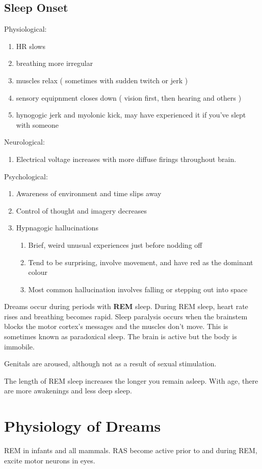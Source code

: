 \documentclass[12pt]{article}
\begin{document}
\subsection*{Sleep Onset}
Physiological:
\begin{enumerate}
  \item HR slows
  \item breathing more irregular
  \item muscles relax ( sometimes with sudden twitch or jerk )
  \item sensory equipnment closes down ( vision first, then hearing and others )
  \item hynogogic jerk and myolonic kick, may have experienced it if you've slept with someone
\end{enumerate}
Neurological:
\begin{enumerate}
\item Electrical voltage increases with more diffuse firings throughout brain.
\end{enumerate}
Psychological:
\begin{enumerate}
\item Awareness of environment and time slips away
\item Control of thought and imagery decreases
\item Hypnagogic hallucinations
\begin{enumerate}
\item Brief, weird unusual experiences just before nodding off
\item Tend to be surprising, involve movement, and have red as the dominant colour
\item Most common hallucination involves falling or stepping out into space
\end{enumerate}
\end{enumerate}
Dreams occur during periods with \textbf{REM} sleep. During REM sleep, heart rate rises and breathing becomes rapid. Sleep paralysis occurs when the brainstem blocks the motor cortex's messages and the muscles don't move. This is sometimes known as paradoxical sleep. The brain is active but the body is immobile.

Genitals are aroused, although not as a result of sexual stimulation.

The length of REM sleep increases the longer you remain asleep. With age, there are more awakenings and less deep sleep.

\section*{Physiology of Dreams}
REM in infants and all mammals. RAS become active prior to and during REM, excite motor neurons in eyes.
\end{document}
